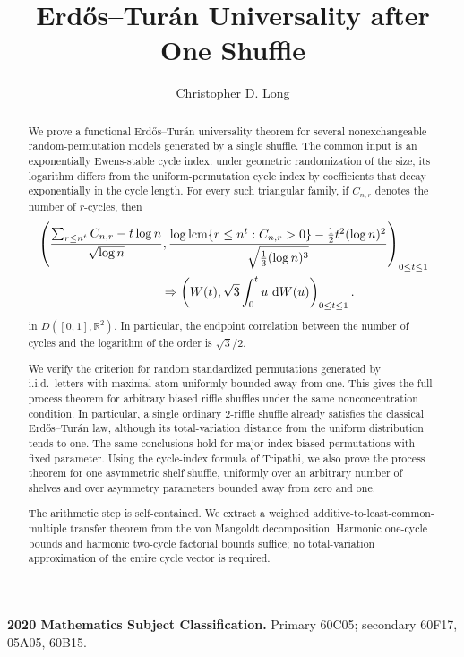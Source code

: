 \documentclass[11pt]{article}
\title{Erd\H{o}s--Tur\'an Universality after One Shuffle}
\author{Christopher D. Long}
\date{}
\theoremstyle{definition}
\theoremstyle{remark}
\newcommand{\dd}{\,\mathrm d}
\newcommand{\lcm}{\operatorname{lcm}}
\newcommand{\R}{\mathbb R}
\begin{document}
\maketitle

\begin{abstract}
We prove a functional Erd\H{o}s--Tur\'an universality theorem for several
nonexchangeable random-permutation models generated by a single shuffle.
The common input is an exponentially Ewens-stable cycle index: under
geometric randomization of the size, its logarithm differs from the
uniform-permutation cycle index by coefficients that decay exponentially
in the cycle length.  For every such triangular family, if $C_{n,r}$
denotes the number of $r$-cycles, then
\[
 \begin{aligned}
 &\left(
 \frac{\sum_{r\le n^t}C_{n,r}-t\log n}{\sqrt{\log n}},
 \frac{\log\lcm\{r\le n^t:C_{n,r}>0\}
             -\frac12t^2(\log n)^2}
      {\sqrt{\frac13(\log n)^3}}
 \right)_{0\le t\le1}
 \\
 &\hspace{35mm}\Rightarrow
 \left(
 W(t),\sqrt3\int_0^t u\,\dd W(u)
 \right)_{0\le t\le1}.
 \end{aligned}
\]
in $D([0,1],\R^2)$.  In particular, the endpoint correlation between the
number of cycles and the logarithm of the order is $\sqrt3/2$.

We verify the criterion for random standardized permutations generated by
i.i.d.\ letters with maximal atom uniformly bounded away from one.  This
gives the full process theorem for arbitrary biased riffle shuffles under
the same nonconcentration condition.  In particular, a single ordinary
$2$-riffle shuffle already satisfies the classical Erd\H{o}s--Tur\'an law,
although its total-variation distance from the uniform distribution tends
to one.  The same conclusions hold for major-index-biased permutations
with fixed parameter.  Using the cycle-index formula of Tripathi, we also
prove the process theorem for one asymmetric shelf shuffle, uniformly over
an arbitrary number of shelves and over asymmetry parameters bounded away
from zero and one.

The arithmetic step is self-contained.  We extract a weighted
additive-to-least-common-multiple transfer theorem from the von Mangoldt
decomposition.  Harmonic one-cycle bounds and harmonic two-cycle factorial
bounds suffice; no total-variation approximation of the entire cycle vector
is required.
\end{abstract}

\medskip
\noindent\textbf{2020 Mathematics Subject Classification.}
Primary 60C05; secondary 60F17, 05A05, 60B15.
\end{document}
